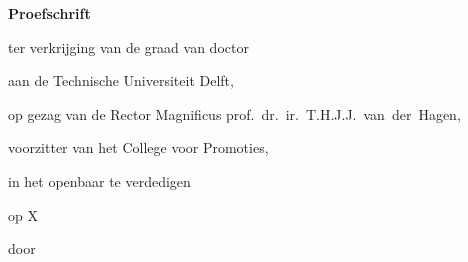\begin{titlepage}

\begin{center}

\vspace*{2\bigskipamount}

{\makeatletter
\titlestyle\bfseries\LARGE\@title
\makeatother}

{\makeatletter
\ifx\@subtitle\undefined\else
    \bigskip
    \titlefont\titleshape\Large\@subtitle
\fi
\makeatother}

\end{center}

\cleardoublepage
\thispagestyle{empty}

\begin{center}


\vspace*{2\bigskipamount}

{\makeatletter
\titlestyle\bfseries\LARGE\@title
\makeatother}

{\makeatletter
\ifx\@subtitle\undefined\else
    \bigskip
    \titlefont\titleshape\Large\@subtitle
\fi
\makeatother}

\vfill


{\Large\titlefont\bfseries Proefschrift}

\bigskip
\bigskip

ter verkrijging van de graad van doctor

aan de Technische Universiteit Delft,

op gezag van de Rector Magnificus prof.~dr.~ir.~T.H.J.J.~van~der~Hagen,

voorzitter van het College voor Promoties,

in het openbaar te verdedigen

op X

\bigskip
\bigskip

door

\bigskip
\bigskip

\makeatletter
{\Large\titlefont\bfseries\@firstname\ \titleshape{\MakeUppercase{\@lastname}}}
\makeatother


\end{center}
\end{titlepage}
